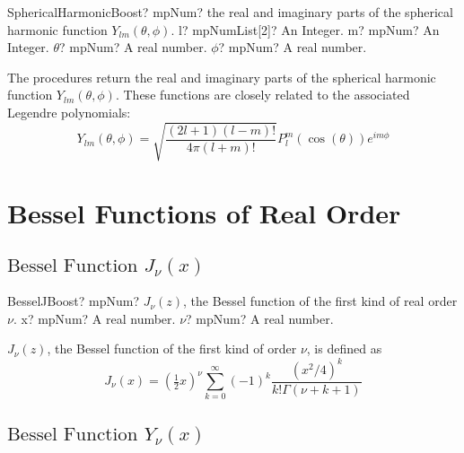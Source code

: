 \begin{mpFunctionsExtract}
	\mpFunctionFour
	{SphericalHarmonicBoost? mpNum? the real and imaginary parts of the spherical harmonic function $Y_{lm}(\theta, \phi)$.}
	{l? mpNumList[2]? An Integer.}
	{m? mpNum? An Integer.}
	{$\theta$? mpNum? A real number.}
	{$\phi$? mpNum? A real number.}
\end{mpFunctionsExtract}

\vspace{0.3cm}
The procedures return the real and imaginary parts of the spherical harmonic function $Y_{lm}(\theta, \phi)$. These functions are closely related to the associated Legendre polynomials:
\begin{equation}
	Y_{lm}(\theta, \phi) = \sqrt{\frac{(2l+1) (l-m)!}{4 \pi (l+m)!}} P^m_l (\cos(\theta)) e^{i m \phi}
\end{equation}


\section{Bessel Functions of Real Order}
\label{BesselFunctionsBoostReal}

\subsection{\texorpdfstring{$\text{Bessel Function }J_{\nu}(x)$}{Bessel Function Jnu}}


\begin{mpFunctionsExtract}
	\mpFunctionTwo
	{BesselJBoost? mpNum? $J_{\nu}(z)$, the Bessel function of the first kind of real order $\nu$.}
	{x? mpNum? A real number.}
	{$\nu$? mpNum? A real number.}
\end{mpFunctionsExtract}


\vspace{0.3cm}
$J_{\nu}(z)$, the Bessel function of the first kind of order $\nu$, is defined as
\begin{equation}
	J_{\nu}(x)  = \left(\tfrac{1}{2}x\right)^{\nu}  \sum_{k=0}^\infty (-1)^k \frac{(x^2 / 4)^k}{k! \Gamma(\nu+k+1)}
\end{equation}





\subsection{\texorpdfstring{$\text{Bessel Function }Y_{\nu}(x)$}{Ynux}}

